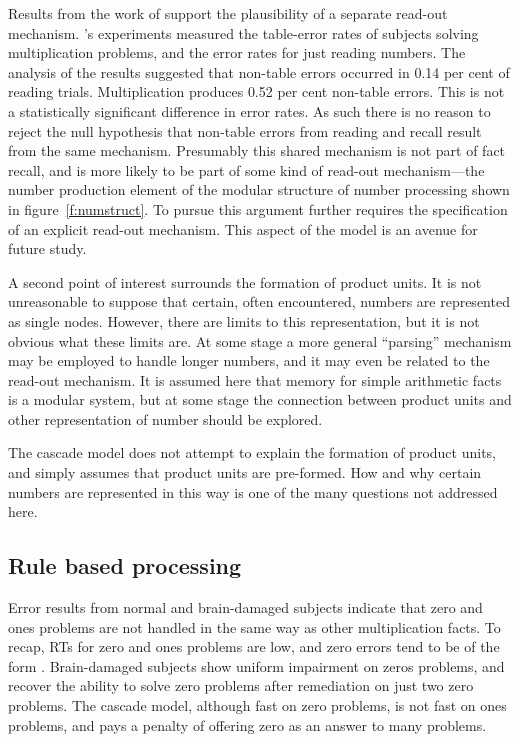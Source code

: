 Results from the work of  support the
plausibility of a separate read-out mechanism. \citeauthor{harlasso}'s
experiments measured the table-error rates of subjects solving
multiplication problems, and the error rates for just reading numbers. The
analysis of the results suggested that non-table errors occurred in 0.14 per
cent of reading trials.  Multiplication produces 0.52 per cent non-table
errors.  This is not a statistically significant difference in error rates.
As such there is no reason to reject the null hypothesis that non-table
errors from reading and recall result from the same mechanism.  Presumably
this shared mechanism is not part of fact recall, and is more likely to be
part of some kind of read-out mechanism---the number production element
of the modular structure of number processing shown in
figure~\ref{f:numstruct}. To pursue this argument further
requires the specification of an explicit read-out mechanism.  This aspect
of the model is an avenue for future study.

A second point of interest surrounds the formation of product units.
It is not unreasonable to suppose that certain, often encountered, numbers
are represented as single nodes.  However, there are limits to this
representation, but it is not obvious what these limits are.  At some
stage a more general ``parsing'' mechanism may be employed to handle
longer numbers, and it may even be related to the read-out mechanism.
It is assumed here that memory for simple arithmetic facts is a
modular system, but at some stage the connection between product units and
other representation of number should be explored.

The cascade model does not attempt to explain the formation of product
units, and simply assumes that product units are pre-formed.  How and why
certain numbers are represented in this way is one of the many
questions not addressed here.


\subsection{Rule based processing}\label{s:rulesres}

Error results from normal and brain-damaged subjects indicate that zero
and ones problems are not handled in the same way as other multiplication
facts.  To recap, RTs for zero and ones problems are low, and zero errors
tend to be of the form .  Brain-damaged subjects show uniform
impairment on zeros problems, and recover the ability to solve zero
problems after  remediation on just two zero problems.  The cascade model,
although fast on zero problems, is not fast on ones problems, and pays a
penalty of offering zero as an answer to many problems.

